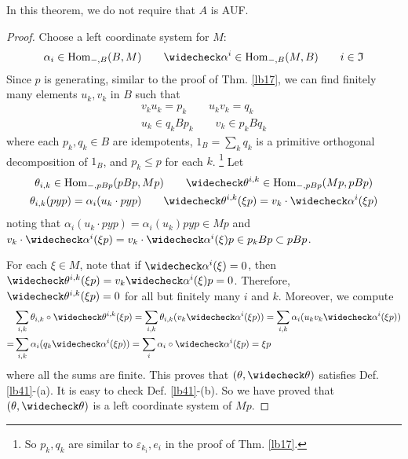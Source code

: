 \documentclass[11pt,b5paper,notitlepage]{article}
\theoremstyle{definition}
\theoremstyle{plain}
\newcommand{\fk}{\mathfrak}
\newcommand{\wch}{\widecheck}
\newcommand{\Hom}{\mathrm{Hom}}
\newcommand{\eps}{\varepsilon}
\numberwithin{equation}{section}
\begin{document}
In this theorem, we do not require that $A$ is AUF.



\begin{proof}
Choose a left coordinate system for $M$:
\begin{align*}
\alpha_i\in\Hom_{-,B}(B,M)\qquad \wch\alpha^i\in \Hom_{-,B}(M,B)\qquad i\in\fk I
\end{align*}
Since $p$ is generating, similar to the proof of Thm. \ref{lb17}, we can find finitely many elements $u_k,v_k$ in $B$ such that
\begin{gather*}
v_ku_k=p_k\qquad u_kv_k=q_k\\
u_k\in q_kBp_k\qquad v_k\in p_kBq_k
\end{gather*}
where each $p_k,q_k\in B$ are idempotents, $1_B=\sum_k q_k$ is a primitive orthogonal decomposition of $1_B$, and $p_k\leq p$ for each $k$. \footnote{So $p_k,q_k$ are similar to $\eps_{k_i},e_i$ in the proof of Thm. \ref{lb17}.} Let
\begin{gather*}
\theta_{i,k}\in \Hom_{-,pBp}(pBp,Mp)\qquad \wch\theta^{i,k}\in\Hom_{-,pBp}(Mp,pBp)\\
\theta_{i,k}(pyp)=\alpha_i(u_k\cdot pyp)\qquad \wch\theta^{i,k}(\xi p)=v_k\cdot \wch\alpha^i(\xi p)
\end{gather*}
noting that $\alpha_i(u_k\cdot pyp)=\alpha_i(u_k)pyp\in Mp$ and $v_k\cdot \wch\alpha^i(\xi p)=v_k\cdot \wch\alpha^i(\xi)p\in p_kBp\subset pBp$. 

For each $\xi\in M$, note that if $\wch\alpha^i(\xi)=0$, then $\wch\theta^{i,k}(\xi p)=v_k\wch\alpha^i(\xi)p=0$. Therefore, $\wch\theta^{i,k}(\xi p)=0$ for all but finitely many $i$ and $k$. Moreover, we compute
\begin{align*}
&\sum_{i,k}\theta_{i,k}\circ\wch\theta^{i,k}(\xi p)=\sum_{i,k}\theta_{i,k}(v_k\wch\alpha^i(\xi p))=\sum_{i,k}\alpha_i(u_k v_k\wch\alpha^i(\xi p))\\
=&\sum_{i,k}\alpha_i(q_k\wch\alpha^i(\xi p))=\sum_{i}\alpha_i\circ\wch\alpha^i(\xi p)=\xi p
\end{align*}
where all the sums are finite. This proves that $(\theta,\wch\theta)$ satisfies Def. \ref{lb41}-(a). It is easy to check Def. \ref{lb41}-(b). So we have proved that $(\theta,\wch\theta)$ is a left coordinate system of $Mp$.



\end{proof}
\end{document}
